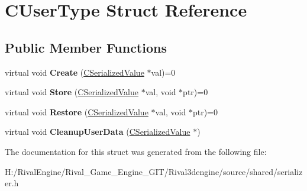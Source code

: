 \hypertarget{struct_c_user_type}{}\section{C\+User\+Type Struct Reference}
\label{struct_c_user_type}
\subsection*{Public Member Functions}
\begin{DoxyCompactItemize}
\item 
\mbox{\label{struct_c_user_type_a09a13c082667901739ea5f919d285df0}} 
virtual void {\bfseries Create} (\hyperlink{class_c_serialized_value}{C\+Serialized\+Value} $\ast$val)=0
\item 
\mbox{\label{struct_c_user_type_add29d8eea83a4a8c085898e304801361}} 
virtual void {\bfseries Store} (\hyperlink{class_c_serialized_value}{C\+Serialized\+Value} $\ast$val, void $\ast$ptr)=0
\item 
\mbox{\label{struct_c_user_type_a85dc3eab70fc8b907ff11c3dfe70ccd5}} 
virtual void {\bfseries Restore} (\hyperlink{class_c_serialized_value}{C\+Serialized\+Value} $\ast$val, void $\ast$ptr)=0
\item 
\mbox{\label{struct_c_user_type_aa3b3c058d84a57212b615335aed1ef67}} 
virtual void {\bfseries Cleanup\+User\+Data} (\hyperlink{class_c_serialized_value}{C\+Serialized\+Value} $\ast$)
\end{DoxyCompactItemize}


The documentation for this struct was generated from the following file\+:\begin{DoxyCompactItemize}
\item 
H\+:/\+Rival\+Engine/\+Rival\+\_\+\+Game\+\_\+\+Engine\+\_\+\+G\+I\+T/\+Rival3dengine/source/shared/serializer.\+h\end{DoxyCompactItemize}
